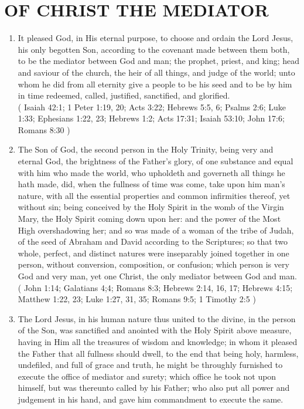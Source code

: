 \documentclass[12pt,a4paper]{book}
\begin{document}
\chapter{OF CHRIST THE MEDIATOR}
\label{ch-Chr-med}
\begin{enumerate}
\item
\label{ch-Chr-med-1}
It pleased God, in His eternal purpose, to choose and ordain the Lord Jesus, his only begotten Son, according to the covenant made between them both, to be the mediator between God and man; the prophet, priest, and king; head and saviour of the church, the heir of all things, and judge of the world; unto whom he did from all eternity give a people to be his seed and to be by him in time redeemed, called, justified, sanctified, and glorified.\\
( Isaiah 42:1; 1 Peter 1:19, 20; Acts 3:22; Hebrews 5:5, 6; Psalms 2:6; Luke 1:33; Ephesians 1:22, 23; Hebrews 1:2; Acts 17:31; Isaiah 53:10; John 17:6; Romans 8:30 )
\item
\label{ch-Chr-med-2}
The Son of God, the second person in the Holy Trinity, being very and eternal God, the brightness of the Father's glory, of one substance and equal with him who made the world, who upholdeth and governeth all things he hath made, did, when the fullness of time was come, take upon him man's nature, with all the essential properties and common infirmities thereof, yet without sin; being conceived by the Holy Spirit in the womb of the Virgin Mary, the Holy Spirit coming down upon her: and the power of the Most High overshadowing her; and so was made of a woman of the tribe of Judah, of the seed of Abraham and David according to the Scriptures; so that two whole, perfect, and distinct natures were inseparably joined together in one person, without conversion, composition, or confusion; which person is very God and very man, yet one Christ, the only mediator between God and man.\\
( John 1:14; Galatians 4;4; Romans 8:3; Hebrews 2:14, 16, 17; Hebrews 4:15; Matthew 1:22, 23; Luke 1:27, 31, 35; Romans 9:5; 1 Timothy 2:5 )
\item
\label{ch-Chr-med-3}
The Lord Jesus, in his human nature thus united to the divine, in the person of the Son, was sanctified and anointed with the Holy Spirit above measure, having in Him all the treasures of wisdom and knowledge; in whom it pleased the Father that all fullness should dwell, to the end that being holy, harmless, undefiled, and full of grace and truth, he might be throughly furnished to execute the office of mediator and surety; which office he took not upon himself, but was thereunto called by his Father; who also put all power and judgement in his hand, and gave him commandment to execute the same.\\

\end{enumerate}
\end{document}
